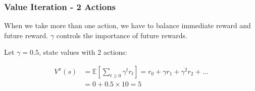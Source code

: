 \documentclass[aspectratio=169, 10pt]{beamer}
\begin{document}
\begin{frame}[t]
    \frametitle{Value Iteration - 2 Actions}
    
    When we take more than one action, we have to balance immediate reward and future reward.
    $\gamma$ controls the importance of future rewards.

    \vspace{1em}
    Let $\gamma = 0.5$, state values with 2 actions:

    \begin{equation*}
        \begin{array} {rcl}
            V^\pi(s) & =  \mathbb{E}[\sum_{t \geq 0} \gamma ^t r_t] = r_0 + \gamma r_{1} + \gamma^2 r_{2} + \ldots \\
                     & =  0 + 0.5 \times 10 = 5
        \end{array}
    \end{equation*}

    \begin{figure}
    \end{figure}

\end{frame}
\end{document}
